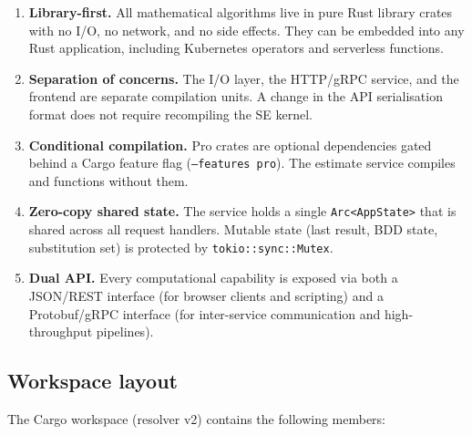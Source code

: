 \documentclass[11pt,a4paper]{article}
\begin{document}
\begin{enumerate}
  \item \textbf{Library-first.}  All mathematical algorithms live in pure
        Rust library crates with no I/O, no network, and no side effects.
        They can be embedded into any Rust application, including
        Kubernetes operators and serverless functions.
  \item \textbf{Separation of concerns.}  The I/O layer, the HTTP/gRPC
        service, and the frontend are separate compilation units.  A
        change in the API serialisation format does not require recompiling
        the SE kernel.
  \item \textbf{Conditional compilation.}  Pro crates are optional
        dependencies gated behind a Cargo feature flag
        (\texttt{--features pro}).  The estimate service compiles and
        functions without them.
  \item \textbf{Zero-copy shared state.}  The service holds a single
        \texttt{Arc<AppState>} that is shared across all request handlers.
        Mutable state (last result, BDD state, substitution set) is
        protected by \texttt{tokio::sync::Mutex}.
  \item \textbf{Dual API.}  Every computational capability is exposed via
        both a JSON/REST interface (for browser clients and scripting)
        and a Protobuf/gRPC interface (for inter-service communication and
        high-throughput pipelines).
\end{enumerate}

\subsection{Workspace layout}

The Cargo workspace (resolver v2) contains the following members:
\end{document}
